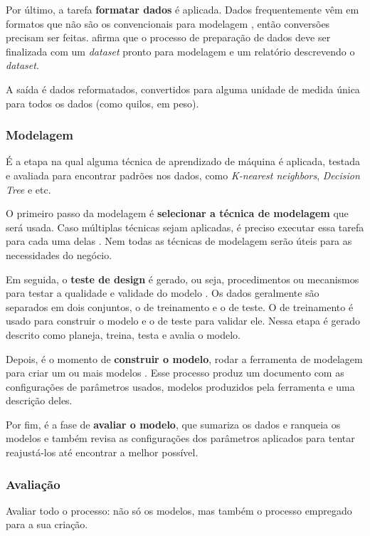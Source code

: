 Por último, a tarefa \textbf{formatar dados} é aplicada. Dados frequentemente vêm em formatos que não são os convencionais para modelagem \citep{dmfd}, então conversões precisam ser feitas.  afirma que o processo de preparação de dados deve ser finalizada com um \textit{dataset} pronto para modelagem e um relatório descrevendo o \textit{dataset}.

A saída é dados reformatados, convertidos para alguma unidade de medida única para todos os dados (como quilos, em peso).

\subsubsection{Modelagem}
É a etapa na qual alguma técnica de aprendizado de máquina é aplicada, testada e avaliada para encontrar padrões nos dados, como \textit{K-nearest neighbors}, \textit{Decision Tree }e etc.

O primeiro passo da modelagem é \textbf{selecionar a técnica de modelagem} que será usada. Caso múltiplas técnicas sejam aplicadas, é preciso executar essa tarefa para cada uma delas \citep{crispmanual}. Nem todas as técnicas de modelagem serão úteis para as necessidades do negócio.

Em seguida, o \textbf{teste de design} é gerado, ou seja, procedimentos ou mecanismos para testar a qualidade e validade do modelo \citep{crispmanual}. Os dados geralmente são separados em dois conjuntos, o de treinamento e o de teste. O de treinamento é usado para construir o modelo e o de teste para validar ele. Nessa etapa é gerado descrito como planeja, treina, testa e avalia o modelo.

Depois, é o momento de \textbf{construir o modelo}, rodar a ferramenta de modelagem para criar um ou mais modelos \citep{crispmanual}. Esse processo produz um documento com as configurações de parâmetros usados, modelos produzidos pela ferramenta e uma descrição deles.

Por fim, é a fase de \textbf{avaliar o modelo}, que sumariza os dados e ranqueia os modelos e também revisa as configurações dos parâmetros aplicados para tentar reajustá-los até encontrar a melhor possível.

\subsubsection{Avaliação}
Avaliar todo o processo: não só os modelos, mas também o processo empregado para a sua criação.

